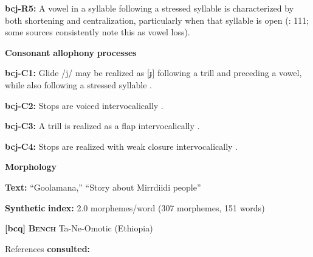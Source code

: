 \begin{styleBody}
\textbf{bcj-R5:} A vowel in a syllable following a stressed syllable is characterized by both shortening and centralization, particularly when that syllable is open (\citealt{Bowern2012}: 111; some sources consistently note this as vowel loss).
\end{styleBody}

\begin{styleBody}
\textbf{Consonant} \textbf{allophony} \textbf{processes}
\end{styleBody}

\begin{styleBody}
\textbf{bcj-C1:} Glide /j/ may be realized as [ɟ] following a trill and preceding a vowel, while also following a stressed syllable \citep[80-1]{Bowern2012}.
\end{styleBody}

\begin{styleBody}
\textbf{bcj-C2:}  Stops are voiced intervocalically \citep[76]{Bowern2012}.
\end{styleBody}

\begin{styleBody}
\textbf{bcj-C3:} A trill is realized as a flap intervocalically \citep[81]{Bowern2012}.
\end{styleBody}

\begin{styleBody}
\textbf{bcj-C4:} Stops are realized with weak closure intervocalically \citep[78]{Bowern2012}.
\end{styleBody}

\begin{styleBody}
\textbf{Morphology}
\end{styleBody}

\begin{styleBody}
\textbf{Text:} “Goolamana,” “Story about Mirrdiidi people” \citep[704-710]{Bowern2012}
\end{styleBody}

\begin{styleBody}
\textbf{Synthetic} \textbf{index:} 2.0 morphemes/word (307 morphemes, 151 words)
\end{styleBody}

\begin{styleBody}
\textbf{[bcq]}   \textbf{\textsc{Bench}  }  Ta-Ne-Omotic (Ethiopia)
\end{styleBody}

\begin{styleBody}
References \textbf{consulted:} \citet{Rapold2006}
\end{styleBody}


